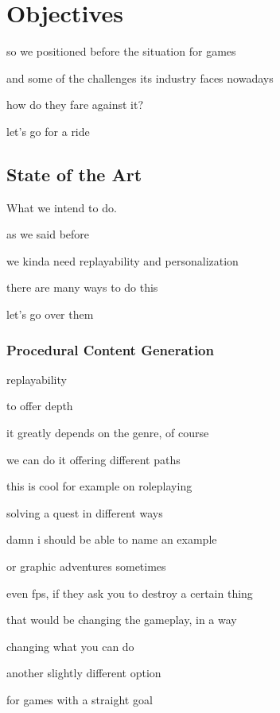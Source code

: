 \chapter{Objectives}

so we positioned before the situation for games

and some of the challenges its industry faces nowadays

how do they fare against it?

let's go for a ride

\section{State of the Art}

What we intend to do.

as we said before

we kinda need replayability and personalization

there are many ways to do this

let's go over them

\subsection{Procedural Content Generation}

replayability

to offer depth

it greatly depends on the genre, of course

we can do it offering different paths

this is cool for example on roleplaying

solving a quest in different ways

damn i should be able to name an example

or graphic adventures sometimes

even fps, if they ask you to destroy a certain thing

that would be changing the gameplay, in a way

changing what you can do

another slightly different option

for games with a straight goal

